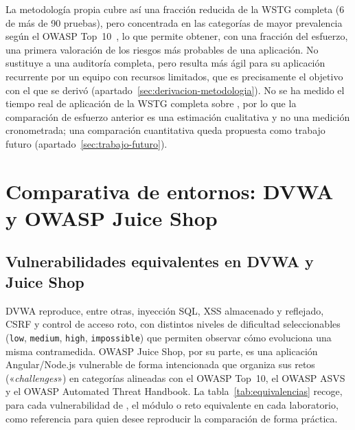 La metodología propia cubre así una fracción reducida de la WSTG completa (6
de más de 90 pruebas), pero concentrada en las categorías de mayor
prevalencia según el OWASP Top~10~, lo que permite obtener,
con una fracción del esfuerzo, una primera valoración de los riesgos más
probables de una aplicación. No sustituye a una auditoría completa, pero
resulta más ágil para su aplicación recurrente por un equipo con recursos
limitados, que es precisamente el objetivo con el que se derivó
(apartado~\ref{sec:derivacion-metodologia}). No se ha medido el tiempo real
de aplicación de la WSTG completa sobre \breachlab, por lo que la
comparación de esfuerzo anterior es una estimación cualitativa y no una
medición cronometrada; una comparación cuantitativa queda propuesta como
trabajo futuro (apartado~\ref{sec:trabajo-futuro}).

\section{Comparativa de entornos: DVWA y OWASP Juice Shop}

\subsection{Vulnerabilidades equivalentes en DVWA y Juice Shop}

DVWA reproduce, entre otras, inyección SQL, XSS almacenado y reflejado,
CSRF y control de acceso roto, con distintos niveles de dificultad
seleccionables (\texttt{low}, \texttt{medium}, \texttt{high},
\texttt{impossible}) que permiten observar cómo evoluciona una misma
contramedida. OWASP Juice Shop, por su parte, es una aplicación
Angular/Node.js vulnerable de forma intencionada que organiza sus retos
(«\emph{challenges}») en categorías alineadas con el OWASP Top~10, el OWASP
ASVS y el OWASP Automated Threat Handbook. La tabla~\ref{tab:equivalencias}
recoge, para cada vulnerabilidad de \breachlab, el módulo o reto
equivalente en cada laboratorio, como referencia para quien desee reproducir
la comparación de forma práctica.

